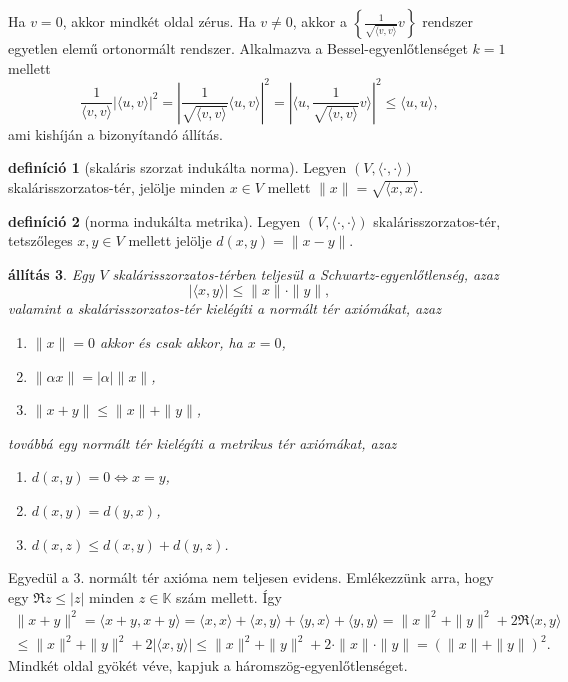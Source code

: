 \documentclass[a4paper, showtrims]{memoir}
\makeatletter
\renewenvironment{proof}[1][\proofname]
    {\par\pushQED{\qed}%
    \normalfont \topsep6\p@\@plus6\p@\relax
    \trivlist
    \item[\hskip\labelsep
        \itshape
    #1\@addpunct{:}]\ignorespaces}
    {\popQED\endtrivlist\@endpefalse}
\theoremstyle{plain}
\newtheorem{proposition}{állítás}[chapter]
\theoremstyle{remark}
\theoremstyle{definition}
\newtheorem{definition}[proposition]{definíció}
\newcommand{\ip}[2]{\langle#1,#2\rangle}
\makeatother
\begin{document}
\begin{proof}
	Ha $v=0$, akkor mindkét oldal zérus.
	Ha $v\neq 0$, akkor a $\left\{ \frac{1}{\sqrt{\ip{v}{v}}}v \right\}$ rendszer egyetlen elemű ortonormált rendszer.
	Alkalmazva a Bessel-egyenlőtlenséget $k=1$ mellett
	\[
		\frac{1}{\ip{v}{v}}
		\left|\ip{u}{v}\right|^2
		=
		|\frac{1}{\sqrt{\ip{v}{v}}}
		\ip{u}{v}|^2
		=
		|\ip{u}{\frac{1}{\sqrt{\ip{v}{v}}}v}|^2
		\leq \ip{u}{u},
	\]
	ami kishíján a bizonyítandó állítás.
\end{proof}
\begin{definition}[skaláris szorzat indukálta norma]
	Legyen $\left( V,\ip{\cdot}{\cdot} \right)$ skalárisszorzatos-tér,
	jelölje minden $x\in V$ mellett $\|x\|=\sqrt{\ip{x}{x}}$.
\end{definition}
\begin{definition}[norma indukálta metrika]
	Legyen $\left( V,\ip{\cdot}{\cdot} \right)$ skalárisszorzatos-tér,
	tetszőleges $x,y\in V$ mellett jelölje $d\left( x,y \right)=\|x-y\|$.
\end{definition}


\begin{proposition}
	Egy $V$ skalárisszorzatos-térben teljesül a \emph{Schwartz-egyenlőtlenség}, azaz
    \[|\ip{x}{y}|\leq\|x\|\cdot\|y\|,\]
	valamint a skalárisszorzatos-tér kielégíti a \emph{normált tér} axiómákat, azaz
	\begin{enumerate}
		\item $\|x\|=0$ akkor és csak akkor, ha $x=0$,
		\item $\|\alpha x\|=|\alpha|\|x\|$,
		\item $\|x+y\|\leq\|x\|+\|y\|$,
	\end{enumerate}
	továbbá egy normált tér kielégíti a \emph{metrikus tér} axiómákat, azaz
	\begin{enumerate}
		\item $d\left( x,y \right)=0\iff x=y$,
		\item $d\left( x,y \right)=d\left( y,x \right)$,
		\item $d\left( x,z \right)\leq d\left( x,y \right)+d\left( y,z \right)$.
		      \qedhere
	\end{enumerate}
\end{proposition}
\begin{proof}
	Egyedül a 3. normált tér axióma nem teljesen evidens.
	Emlékezzünk arra, hogy egy $\Re z\leq |z|$ minden $z\in\mathbb{K}$ szám mellett.
	Így
	\begin{multline*}
		\|x+y\|^2
		=
		\ip{x+y}{x+y}
		=
		\ip{x}{x}+\ip{x}{y}+\ip{y}{x}+\ip{y}{y}
		=\|x\|^2+\|y\|^2+2\Re\ip{x}{y}
		\\
		\leq
		\|x\|^2+\|y\|^2+2|\ip{x}{y}|
		\leq
		\|x\|^2+\|y\|^2+2\cdot\|x\|\cdot\|y\|
		=\left( \|x\|+\|y\| \right)^2.
	\end{multline*}
	Mindkét oldal gyökét véve, kapjuk a háromszög-egyenlőtlenséget.
\end{proof}
\end{document}
